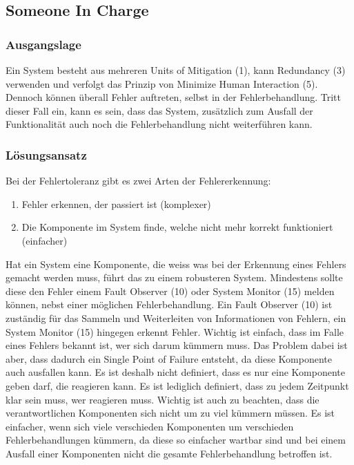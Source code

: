 \subsection{Someone In Charge}

\subsubsection*{Ausgangslage}
Ein System besteht aus mehreren Units of Mitigation (1), kann Redundancy (3) verwenden und verfolgt das Prinzip von Minimize Human Interaction (5).
Dennoch können überall Fehler auftreten, selbst in der Fehlerbehandlung. Tritt dieser Fall ein, kann es sein, dass das System, zusätzlich zum Ausfall der Funktionalität auch noch die Fehlerbehandlung nicht weiterführen kann.

\subsubsection*{Lösungsansatz}

Bei der Fehlertoleranz gibt es zwei Arten der Fehlererkennung:
\begin{enumerate}
	\item Fehler erkennen, der passiert ist (komplexer)
	\item Die Komponente im System finde, welche nicht mehr korrekt funktioniert (einfacher)
\end{enumerate}
Hat ein System eine Komponente, die weiss was bei der Erkennung eines Fehlers gemacht werden muss, führt das zu einem robusteren System. Mindestens sollte diese den Fehler einem Fault Observer (10) oder System Monitor (15) melden können, nebst einer möglichen Fehlerbehandlung. Ein Fault Observer (10) ist zuständig für das Sammeln und Weiterleiten von Informationen von Fehlern, ein System Monitor (15) hingegen erkennt Fehler.
Wichtig ist einfach, dass im Falle eines Fehlers bekannt ist, wer sich darum kümmern muss.
Das Problem dabei ist aber, dass dadurch ein Single Point of Failure entsteht, da diese Komponente auch ausfallen kann. Es ist deshalb nicht definiert, dass es nur eine Komponente geben darf, die reagieren kann. Es ist lediglich definiert, dass zu jedem Zeitpunkt klar sein muss, wer reagieren muss.
Wichtig ist auch zu beachten, dass die verantwortlichen Komponenten sich nicht um zu viel kümmern müssen. Es ist einfacher, wenn sich viele verschieden Komponenten um verschieden Fehlerbehandlungen kümmern, da diese so einfacher wartbar sind und bei einem Ausfall einer Komponenten nicht die gesamte Fehlerbehandlung betroffen ist.

